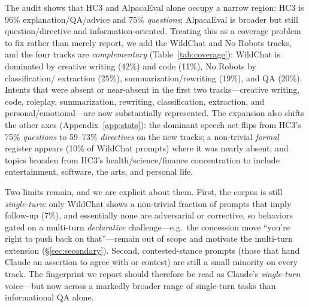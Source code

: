 \documentclass[11pt]{article}
\begin{document}
The audit shows that HC3 and AlpacaEval alone occupy a narrow region: HC3 is 96\%
explanation/QA/advice and 75\% \emph{questions}; AlpacaEval is broader but still
question/directive and information-oriented. Treating this as a coverage problem
to fix rather than merely report, we add the WildChat and No Robots tracks, and
the four tracks are \emph{complementary} (Table~\ref{tab:coverage}): WildChat is
dominated by creative writing (42\%) and code (11\%), No Robots by classification/
extraction (25\%), summarization/rewriting (19\%), and QA (20\%). Intents that
were absent or near-absent in the first two tracks---creative writing, code,
roleplay, summarization, rewriting, classification, extraction, and
personal/emotional---are now substantially represented. The expansion also shifts
the other axes (Appendix~\ref{app:stats}): the dominant speech act flips from HC3's
75\% \emph{questions} to 59--73\% \emph{directives} on the new tracks; a non-trivial
\emph{formal} register appears (10\% of WildChat prompts) where it was nearly
absent; and topics broaden from HC3's health/science/finance concentration to
include entertainment, software, the arts, and personal life.

Two limits remain, and we are explicit about them. First, the corpus is still
\emph{single-turn}: only WildChat shows a non-trivial fraction of prompts that
imply follow-up (7\%), and essentially none are adversarial or corrective, so
behaviors gated on a multi-turn \emph{declarative} challenge---e.g.\ the concession
move ``you're right to push back on that''---remain out of scope and motivate the
multi-turn extension (\S\ref{sec:secondary}). Second, contested-stance prompts
(those that hand Claude an assertion to agree with or contest) are still a small
minority on every track. The fingerprint we report should therefore be read as
Claude's \emph{single-turn} voice---but now across a markedly broader range of
single-turn tasks than informational QA alone.
\end{document}
